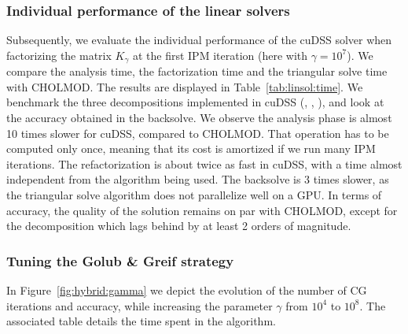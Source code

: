 \subsubsection{Individual performance of the linear solvers}
Subsequently, we evaluate the individual performance of the cuDSS solver when factorizing the matrix $K_{\gamma}$ at the first IPM iteration (here with $\gamma = 10^7$).
We compare the analysis
time, the factorization time and the triangular solve time with CHOLMOD.
The results are displayed in Table~\ref{tab:linsol:time}. We benchmark the
three decompositions implemented in cuDSS (\llt, \ldlt, \lu), and look at
the accuracy obtained in the backsolve. We observe the analysis phase
is almost 10 times slower for cuDSS, compared to CHOLMOD.
That operation has to be computed only once, meaning that its cost is amortized if we run
many IPM iterations. The refactorization is about twice as fast in cuDSS,
with a time almost independent from the algorithm being used. The backsolve
is 3 times slower, as the triangular solve algorithm does not parallelize
well on a GPU. In terms of accuracy, the quality of the solution remains on
par with CHOLMOD, except for the \ldlt decomposition which lags behind by at least
2 orders of magnitude.


\begin{table}[!ht]
  \centering
  \caption{Comparing the performance of cuDSS with CHOLMOD.
    The matrix $K_\gamma$ is symmetric positive definite, with
    a size $n = 85,568$. The matrix is extremely sparse, with only $1,057,200$ non-zero entries ($0.01$\%).
    \label{tab:linsol:time}
    (A30 GPU)
  }
\end{table}


\subsubsection{Tuning the Golub \& Greif strategy}
In Figure~\ref{fig:hybrid:gamma} we depict the evolution of the number
of CG iterations and accuracy, while increasing the parameter $\gamma$
from $10^4$ to $10^8$. The associated table details the time spent
in the algorithm.

